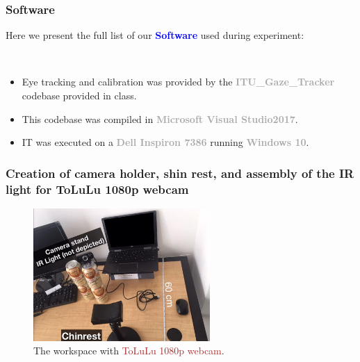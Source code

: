\documentclass{beamer}
\begin{document}
    \begin{frame}
        \frametitle{Software}
        \center
        Here we present the full list of our \textbf{\textcolor{blue}{Software}}
        used during experiment:

        ~\

        \begin{itemize}
            \item Eye tracking and calibration was provided by the
            \textbf{\textcolor{darkgray}{ITU\_Gaze\_Tracker}} codebase provided in
            class.

            \item This codebase was compiled in
            \textbf{\textcolor{darkgray}{Microsoft Visual Studio2017}}.

            \item IT was executed on a \textbf{\textcolor{darkgray}{Dell Inspiron 7386}}
            running \textbf{\textcolor{darkgray}{Windows 10}}.
        \end{itemize}

    \end{frame}

    \begin{frame}
        \frametitle{Creation of camera holder, shin rest, and assembly of the
        IR light for ToLuLu 1080p webcam}

        \begin{figure}
            \begin{center}
                \includegraphics[width=0.6\textwidth]{Work_space_Tolulu.jpg}
            \end{center}
            \caption{The workspace with \textcolor{brown}{ToLuLu 1080p webcam}.}
            \label{fig:Workspace_Tolulu}
        \end{figure}

    \end{frame}
\end{document}
